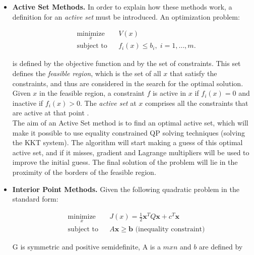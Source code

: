 \begin{itemize}

\item \textbf{Active Set Methods.} In order to explain how these methods work, a definition for an \emph{active set} must be introduced. An optimization problem:
 
\begin{equation} \label{eq:optimization1}
 \begin{aligned}
 & \underset{x}{\text{minimize}}
 & & V(x) \\
 & \text{subject to}
 & & f_i(x) \leq b_i, \; 	i = 1, \ldots, m.
 \end{aligned}
\end{equation}

is defined by the objective function and by the set of constraints. This set defines the \emph{feasible region}, which is the set of all $x$ that satisfy the constraints, and thus are considered in the search for the optimal solution. Given $x$ in the feasible region, a constraint $f$ is active in $x$ if $f_i(x) = 0$ and inactive if $f_i(x) > 0$. The \emph{active set} at $x$ comprises all the constraints that are active at that point \cite{Nocedal&Wright2006}. \\

The aim of an Active Set method is to find an optimal active set, which will make it possible to use equality constrained QP solving techniques (solving the KKT system). The algorithm will start making a guess of this optimal active set, and if it misses, gradient and Lagrange multipliers will be used to improve the initial guess. The final solution of the problem will lie in the proximity of the borders of the  feasible region.

\item \textbf{Interior Point Methods.} Given the following quadratic problem in the standard form:

\begin{equation} \label{eq:quadproblemIP}
 \begin{aligned}
 & \underset{x}{\text{minimize}}
 & & J(x) = \frac{1}{2} \mathbf{x}^T Q \mathbf{x} + c^T \mathbf{x} \\
 & \text{subject to} 
 & & A\mathbf{x} \geq \mathbf b \mbox{  (inequality constraint)}
 \end{aligned}
\end{equation}

G is symmetric and positive semidefinite, A is a $m x n$ and $b$ are defined by 


\end{itemize}
